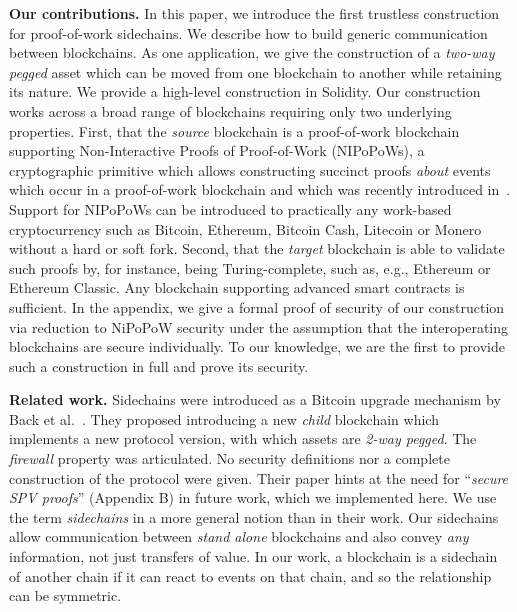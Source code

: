 \noindent\textbf{Our contributions. } In this paper, we introduce the first
trustless construction for proof-of-work sidechains. We describe how to build
generic communication between blockchains. As one application, we give the
construction of a \emph{two-way pegged} asset which can be moved from one
blockchain to another while retaining its nature. We provide a high-level
construction in Solidity. Our construction works across a broad range of
blockchains requiring only two underlying properties. First, that the
\emph{source} blockchain is a proof-of-work blockchain supporting
Non-Interactive Proofs of Proof-of-Work (NIPoPoWs), a cryptographic primitive
which allows constructing succinct proofs \emph{about} events which occur in a
proof-of-work blockchain and which was recently introduced in~\cite{nipopows}.
Support for NIPoPoWs can be introduced to practically any
work-based cryptocurrency such as Bitcoin, Ethereum, Bitcoin Cash, Litecoin or
Monero without a hard or soft fork. Second, that the \emph{target} blockchain is
able to validate such proofs by, for instance, being Turing-complete, such as,
e.g., Ethereum or Ethereum Classic. Any blockchain supporting advanced smart
contracts is sufficient. In the appendix, we give a formal proof of security of
our construction via reduction to NiPoPoW security under the assumption that the
interoperating blockchains are secure individually. To our knowledge, we are the
first to provide such a construction in full and prove its security.

\noindent\textbf{Related work. }
Sidechains were introduced as a Bitcoin upgrade mechanism by Back et
al.~\cite{sidechains}. They proposed introducing a new \emph{child} blockchain
which implements a new protocol version, with which assets are \emph{2-way
pegged}. The \emph{firewall} property was articulated. No security definitions
nor a complete construction of the protocol were given. Their paper hints at the
need for ``\emph{secure SPV proofs}'' (Appendix B) in future work, which we
implemented here. We use the term \emph{sidechains} in a more general notion
than in their work. Our sidechains allow communication between \emph{stand
alone} blockchains and also convey \emph{any} information, not just transfers of
value. In our work, a blockchain is a sidechain of another chain if it can react
to events on that chain, and so the relationship can be symmetric.

